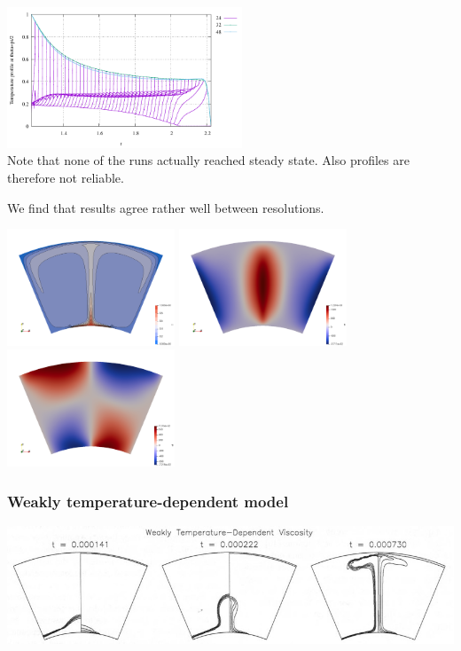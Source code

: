 \begin{center}
\includegraphics[width=7cm]{python_codes/fieldstone_106/results/exp1/profile_T.pdf}\\
{\captionfont Note that none of the runs actually reached steady state. Also 
profiles are therefore not reliable.} 
\end{center}
We find that results agree rather well between resolutions.

\includegraphics[width=5cm]{python_codes/fieldstone_106/results/exp1/nelr32/T}
\includegraphics[width=5cm]{python_codes/fieldstone_106/results/exp1/nelr32/vr}
\includegraphics[width=5cm]{python_codes/fieldstone_106/results/exp1/nelr32/vt}

\newpage
\subsubsection*{Weakly temperature-dependent model}
\begin{center}
\includegraphics[width=15cm]{python_codes/fieldstone_106/images/keki97c}
\end{center}

